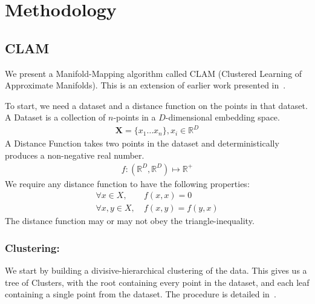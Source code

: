 \section{Methodology}
\label{sec:methodology}

\subsection{CLAM}
\label{subsec:methodology:manifold}

We present a Manifold-Mapping algorithm called CLAM (Clustered Learning of Approximate Manifolds).
This is an extension of earlier work presented in~\cite{ishaq2019entropy}.

To start, we need a dataset and a distance function on the points in that dataset.
A Dataset is a collection of $n$-points in a $D$-dimensional embedding space.
\begin{gather*}
    \textbf{X} = \{x_1 \dots x_n\}, x_i \in \mathbb{R}^D
\end{gather*}
A Distance Function takes two points in the dataset and deterministically produces a non-negative real number.
\begin{gather*}
    f : (\mathbb{R}^D, \mathbb{R}^D) \mapsto \mathbb{R}^+
\end{gather*}
We require any distance function to have the following properties:
\begin{align*}
    \forall x \in X, & \ f(x, x) = 0 \\
    \forall x, y \in X, & \ f(x, y) = f(y, x)
\end{align*}
The distance function may or may not obey the triangle-inequality.

\subsubsection*{Clustering:}
We start by building a divisive-hierarchical clustering of the data.
This gives us a tree of Clusters, with the root containing every point in the dataset, and each leaf containing a single point from the dataset.
The procedure is detailed in~\cite{ishaq2019entropy}.

